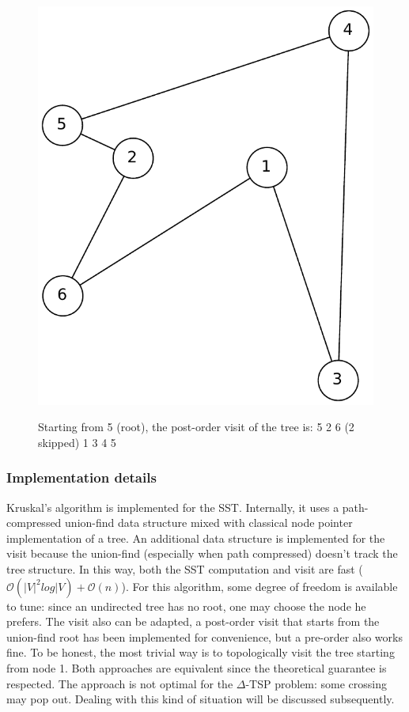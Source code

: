 \begin{figure}[h]
\begin{minipage}{.3\textwidth}
        \label{fig:sub2}
    \end{minipage}
    \begin{minipage}{.3\textwidth}
        \centering
        \includegraphics[width=0.8\linewidth]{figures/2approxc}
        \label{fig:sub2}
    \end{minipage}
    \caption[Shortcut example]{\centering Starting from 5 (root), the post-order visit of the tree
    is: 5 2 6 (2 skipped) 1 3 4 5}
\end{figure}

\subsubsection{Implementation details}
Kruskal's algorithm is implemented for the SST. Internally, it uses a
path-compressed union-find data structure mixed with classical node pointer
implementation of a tree. An additional data structure is implemented for the
visit because the union-find (especially when path compressed) doesn't track the
tree structure. In this way, both the SST computation and visit are fast
($\mathcal{O}(|V|^2log|V) + \mathcal{O}(n)$).
For this algorithm, some degree of freedom is available to tune: since an
undirected tree has no root, one may choose the node he prefers. The visit also
can be adapted, a post-order visit that starts from the union-find root has been
implemented for convenience, but a pre-order also works fine. To be honest, the
most trivial way is to topologically visit the tree starting from node 1. Both
approaches are equivalent since the theoretical guarantee is respected.
The approach is not optimal for the $\Delta$-TSP problem: some crossing may
pop out. Dealing with this kind of situation will be discussed subsequently.

